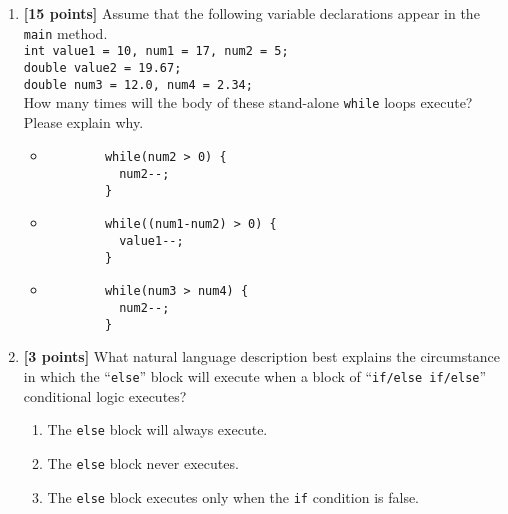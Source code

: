 \begin{enumerate}
\begin{itemize}
\end{itemize}

\vspace{2.5in}

\item {\bf [15 points]}
  Assume that the following variable declarations appear in the {\tt main} method.\\ 

{\tt int value1 = 10, num1 = 17, num2 = 5;}\\
{\tt double value2 = 19.67;}\\
{\tt double num3 = 12.0, num4 = 2.34;}\\ 

\noindent
How many times will the body of these stand-alone {\tt while} loops execute? Please explain why.
 
 \begin{itemize}
 \item
     \begin{verbatim}
        while(num2 > 0) {
          num2--;
        }
     \end{verbatim}
 
 \item 
 \begin{verbatim}
        while((num1-num2) > 0) {
          value1--;
        }
     \end{verbatim}

 \item 
 \begin{verbatim}
        while(num3 > num4) {
          num2--;
        }
     \end{verbatim}

\vspace{0.3in}
 \end{itemize}


\item {\bf [3 points]}
What natural language description best explains the circumstance in which the ``{\tt else}'' block will
execute when a block of ``{\tt if/else if/else}'' conditional logic executes?
\begin{enumerate}
  \item The {\tt else} block will always execute.

\medskip
\item The {\tt else} block never executes.

\medskip
\item The {\tt else} block executes only when the {\tt if} condition is false.


\end{enumerate}
\end{enumerate}
